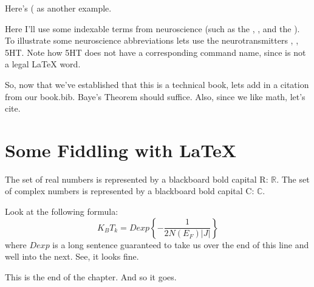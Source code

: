 Here's \VR ( as another example.

\LineSeparator

Here I'll use some indexable terms from neuroscience (such as the , , and the ). To illustrate some neuroscience abbreviations lets use the neurotransmitters \NE, \DA, \ac{5HT}. Note how 5HT does not have a corresponding command name, since is not a legal LaTeX word.

So, now that we've established that this is a technical book, lets add in a citation from our book.bib.  Baye's Theorem should suffice\cite{bayes1763}. Also, since we like math, let's cite\cite{laplace1774}.

\LineSeparator
\section{Some Fiddling with LaTeX}

\newcommand{\R}{$\mathbb{R}$}
\newcommand{\C}{$\mathbb{C}$}
%    
   
The set of real numbers is represented by a blackboard bold capital R: \R.
The set of complex numbers is represented by a blackboard bold capital C: \C.

%
%    
    
Look at the following formula:
%
\begin{equation}
K_BT_k=Dexp\left\lbrace -\frac{1}{2N(E_F)|J|}\right\rbrace
\end{equation}
%
where $Dexp$ is a long sentence guaranteed to take us over the
end of this line and well into the next. See, it looks fine.

\blindtext[4]

This is the end of the chapter. And so it goes.
